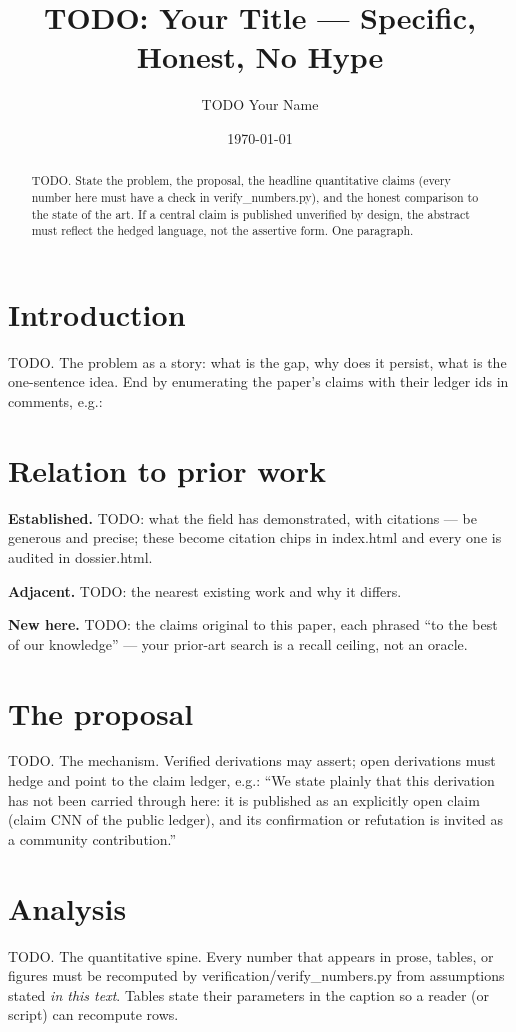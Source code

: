 \documentclass[11pt]{article}
\title{\textbf{TODO: Your Title — Specific, Honest, No Hype}}
\author[1]{TODO Your Name}
\affil[1]{TODO Your Affiliation (or: Independent Researcher, City, Country)}
\date{\today}
\begin{document}
\maketitle
\thispagestyle{fancy}

\begin{abstract}
TODO. State the problem, the proposal, the headline quantitative claims
(every number here must have a check in verify\_numbers.py), and the
honest comparison to the state of the art. If a central claim is
published unverified by design, the abstract must reflect the hedged
language, not the assertive form. One paragraph.
\end{abstract}

\section{Introduction}
TODO. The problem as a story: what is the gap, why does it persist, what
is the one-sentence idea. End by enumerating the paper's claims with
their ledger ids in comments, e.g.:

\section{Relation to prior work}
\textbf{Established.} TODO: what the field has demonstrated, with
citations — be generous and precise; these become citation chips in
index.html and every one is audited in dossier.html.

\textbf{Adjacent.} TODO: the nearest existing work and why it differs.

\textbf{New here.} TODO: the claims original to this paper, each phrased
``to the best of our knowledge'' — your prior-art search is a recall
ceiling, not an oracle.

\section{The proposal}
TODO. The mechanism. Verified derivations may assert; open derivations
must hedge and point to the claim ledger, e.g.: ``We state plainly that
this derivation has not been carried through here: it is published as an
explicitly open claim (claim CNN of the public ledger), and its
confirmation or refutation is invited as a community contribution.''

\section{Analysis}
TODO. The quantitative spine. Every number that appears in prose,
tables, or figures must be recomputed by verification/verify\_numbers.py
from assumptions stated \emph{in this text}. Tables state their
parameters in the caption so a reader (or script) can recompute rows.
\end{document}
